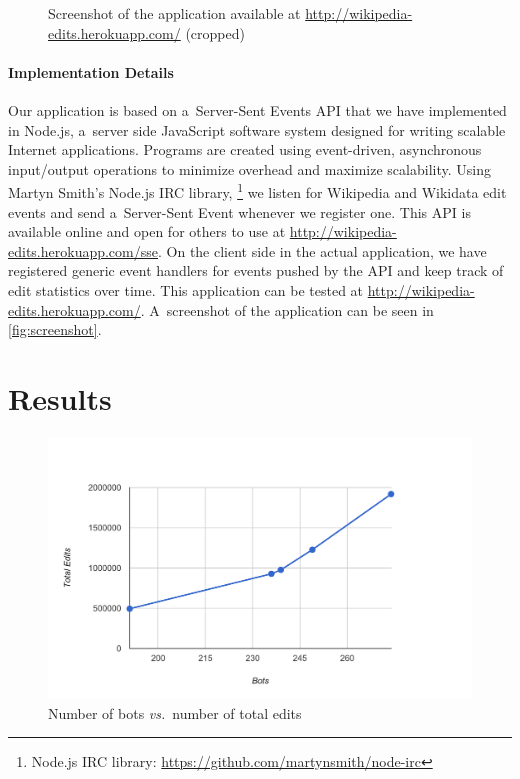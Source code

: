 \documentclass{sig-alternate}
\newcommand{\inlinelistingsize}{\fontsize{8pt}{11pt}}
\let\oldurl\url
\renewcommand{\url}[1]{\inlinelistingsize\oldurl{#1}}
\begin{document}
\begin{figure}[h!]
  \centering
  \caption{Screenshot of the application available at \url{http://wikipedia-edits.herokuapp.com/} (cropped)}
  \label{fig:screenshot}
\end{figure}

\paragraph{Implementation Details}

Our application is based on a~Server-Sent Events API
that we have implemented in Node.js,
a~server side JavaScript software system
designed for writing scalable Internet applications.
Programs are created using event-driven,
asynchronous input/output operations
to minimize overhead and maximize scalability.
Using Martyn Smith's Node.js IRC library,%
\footnote{Node.js IRC library:
\url{https://github.com/martynsmith/node-irc}}
we listen for Wikipedia and Wikidata edit events
and send a~Server-Sent Event whenever we register one.
This API is available online and open for others to use at
\url{http://wikipedia-edits.herokuapp.com/sse}.
On the client side in the actual application,
we have registered generic event handlers for events
pushed by the API and keep track of edit statistics over time.
This application can be tested at
\url{http://wikipedia-edits.herokuapp.com/}.
A~screenshot of the application
can be seen in \autoref{fig:screenshot}.

\section{Results}

\begin{figure}[p]
  \center
  \includegraphics[width=0.8\linewidth]{bots-total-edits.pdf}
  \caption{Number of bots \emph{vs.}\ number of total edits}
  \label{fig:bots-total-edits}
\end{figure}
\end{document}
